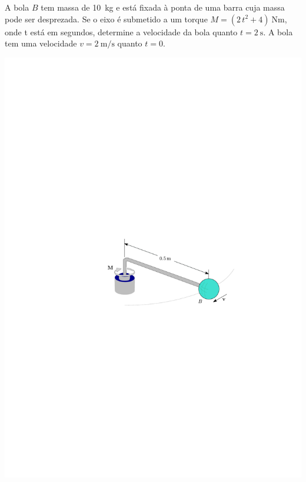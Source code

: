 \item A bola $B$ tem massa de \SI{10}{\kilogram} e está fixada à ponta de uma barra cuja massa pode ser desprezada. Se
o eixo é submetido a um torque $M=(2\,t^{2} + 4)\SI{}{\newton\meter}$, onde t está em segundos, determine a velocidade
da bola quanto $t=\SI{2}{\second}$. A bola tem uma velocidade $v=\SI{2}{\meter/\second}$ quanto $t=0$.

\begin{flushright}
	\includegraphics[scale=1.2]{images/draw_9}
\end{flushright}
